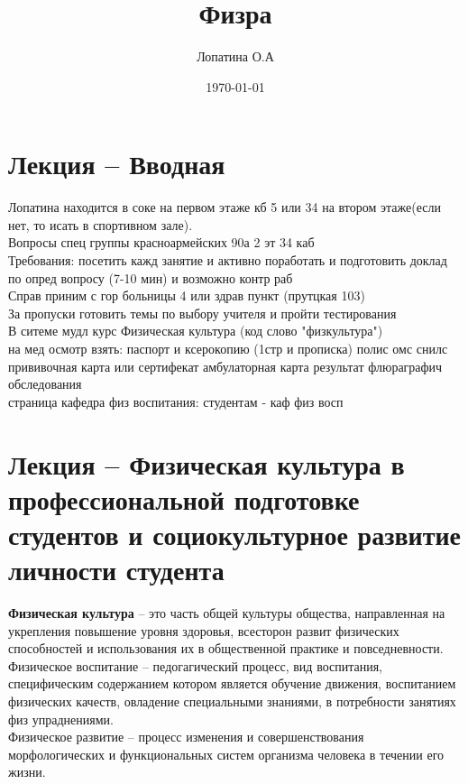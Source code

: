 \documentclass[a4paper, 12pt]{article}
\title{Физра}
\author{Лопатина О.А}
\date{\today}
\begin{document}
\sffamily
\maketitle

\section{Лекция  -- Вводная} 

Лопатина находится в соке на первом этаже кб 5 или 34 на втором этаже(если нет, то исать в спортивном зале).\\
Вопросы спец группы красноармейских 90а 2 эт 34 каб\\
Требования: посетить кажд занятие и активно поработать и подготовить доклад по опред вопросу (7-10 мин) и возможно контр раб\\
Справ приним с гор больницы 4 или здрав пункт (прутцкая 103)\\
За пропуски готовить темы по выбору учителя и пройти тестирования\\
В ситеме мудл курс Физическая культура (код слово "физкультура")\\
на мед осмотр взять: паспорт и ксерокопию (1стр и прописка) полис омс снилс прививочная карта или сертифекат амбулаторная карта результат флюраграфич обследования\\
страница кафедра физ воспитания: студентам - каф физ восп\\

\newpage
\section{Лекция  -- Физическая культура в профессиональной подготовке студентов и социокультурное развитие личности студента}

\quad\textbf{Физическая культура} -- это часть общей культуры общества, направленная на укрепления повышение уровня здоровья, всесторон развит физических способностей и использования их в общественной практике и повседневности.\\

Физическое воспитание -- педогагический процесс, вид воспитания, специфическим содержанием котором является обучение движения, воспитанием физических качеств, овладение специальными знаниями, в потребности занятиях физ упраднениями.\\

Физическое развитие -- процесс изменения и совершенствования морфологических и функциональных систем организма человека в течении его жизни.\\
\end{document}
